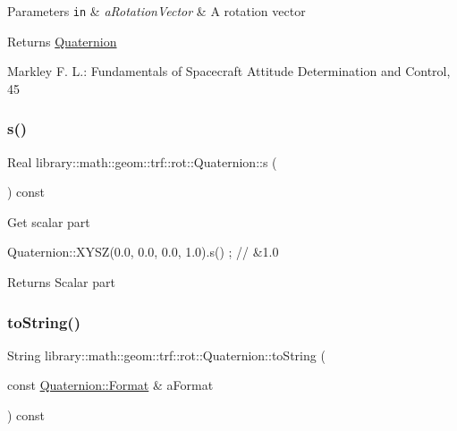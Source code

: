 \begin{DoxyParams}[1]{Parameters}
\mbox{\tt in}  & {\em a\+Rotation\+Vector} & A rotation vector \\
\hline
\end{DoxyParams}
\begin{DoxyReturn}{Returns}
\hyperlink{classlibrary_1_1math_1_1geom_1_1trf_1_1rot_1_1_quaternion}{Quaternion} 
\end{DoxyReturn}
Markley F. L.\+: Fundamentals of Spacecraft Attitude Determination and Control, 45 \mbox{\label{classlibrary_1_1math_1_1geom_1_1trf_1_1rot_1_1_quaternion_a7b5045b46500d4f20e98ff29a9ed4c88}} 
\subsubsection{\texorpdfstring{s()}{s()}}
{\footnotesize\ttfamily Real library\+::math\+::geom\+::trf\+::rot\+::\+Quaternion\+::s (\begin{DoxyParamCaption}{ }\end{DoxyParamCaption}) const}

Get scalar part


\begin{DoxyCode}
Quaternion::XYSZ(0.0, 0.0, 0.0, 1.0).s() ; \textcolor{comment}{// &1.0}
\end{DoxyCode}


\begin{DoxyReturn}{Returns}
Scalar part 
\end{DoxyReturn}
\mbox{\label{classlibrary_1_1math_1_1geom_1_1trf_1_1rot_1_1_quaternion_adb8b06d466e8235dd5ff4ded9331a85f}} 
\subsubsection{\texorpdfstring{to\+String()}{toString()}\hspace{0.1cm}{\footnotesize\ttfamily [1/2]}}
{\footnotesize\ttfamily String library\+::math\+::geom\+::trf\+::rot\+::\+Quaternion\+::to\+String (\begin{DoxyParamCaption}\item[{const \hyperlink{classlibrary_1_1math_1_1geom_1_1trf_1_1rot_1_1_quaternion_a2ca851b117657819310fe5a9b9e5d681}{Quaternion\+::\+Format} \&}]{a\+Format }\end{DoxyParamCaption}) const}




